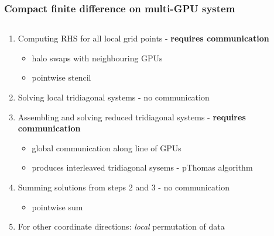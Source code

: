 \begin{frame}
\frametitle{Compact finite difference on multi-GPU system}
\footnotesize
\begin{columns}
\begin{column}{0.5\textwidth}
\begin{enumerate}
\item Computing RHS for all local grid points - \textbf{requires communication}
\begin{itemize}
    \footnotesize
    \item halo swaps with neighbouring GPUs
    \item pointwise stencil
\end{itemize}
\item Solving local tridiagonal systems - no communication
\item Assembling and solving reduced tridiagonal systems - \textbf{requires communication}
\begin{itemize}
    \footnotesize
    \item global communication along line of GPUs
    \item produces interleaved tridiagonal sysems - pThomas algorithm
\end{itemize}
\item Summing solutions from steps 2 and 3 - no communication
\begin{itemize}
    \footnotesize
    \item pointwise sum
\end{itemize}
\item For other coordinate directions: \emph{local} permutation of data
\end{enumerate}
\end{column}
\begin{column}{0.5\textwidth}
\end{column}
\end{columns}
\end{frame}


